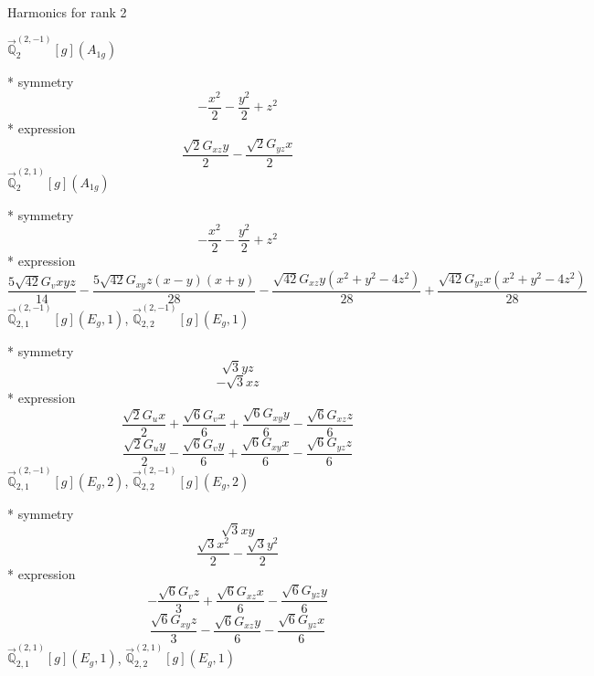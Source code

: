 \documentclass[fleqn,8pt]{jsarticle}
\begin{document}
\noindent * Harmonics for rank 2

\noindent\quad $\vec{\mathbb{Q}}_{2}^{(2,-1)}[g](A_{1g})$

\noindent\quad ** symmetry
\begin{dmath*}
- \frac{x^{2}}{2} - \frac{y^{2}}{2} + z^{2}
\end{dmath*}
\noindent\quad ** expression
\begin{dmath*}
\frac{\sqrt{2} G_{xz} y}{2} - \frac{\sqrt{2} G_{yz} x}{2}
\end{dmath*}
\noindent\quad $\vec{\mathbb{Q}}_{2}^{(2,1)}[g](A_{1g})$

\noindent\quad ** symmetry
\begin{dmath*}
- \frac{x^{2}}{2} - \frac{y^{2}}{2} + z^{2}
\end{dmath*}
\noindent\quad ** expression
\begin{dmath*}
\frac{5 \sqrt{42} G_{v} x y z}{14} - \frac{5 \sqrt{42} G_{xy} z \left(x - y\right) \left(x + y\right)}{28} - \frac{\sqrt{42} G_{xz} y \left(x^{2} + y^{2} - 4 z^{2}\right)}{28} + \frac{\sqrt{42} G_{yz} x \left(x^{2} + y^{2} - 4 z^{2}\right)}{28}
\end{dmath*}
\noindent\quad $\vec{\mathbb{Q}}_{2,1}^{(2,-1)}[g](E_{g},1)$, $\vec{\mathbb{Q}}_{2,2}^{(2,-1)}[g](E_{g},1)$

\noindent\quad ** symmetry
\begin{dmath*}
\sqrt{3} y z
\end{dmath*}
\begin{dmath*}
- \sqrt{3} x z
\end{dmath*}
\noindent\quad ** expression
\begin{dmath*}
\frac{\sqrt{2} G_{u} x}{2} + \frac{\sqrt{6} G_{v} x}{6} + \frac{\sqrt{6} G_{xy} y}{6} - \frac{\sqrt{6} G_{xz} z}{6}
\end{dmath*}
\begin{dmath*}
\frac{\sqrt{2} G_{u} y}{2} - \frac{\sqrt{6} G_{v} y}{6} + \frac{\sqrt{6} G_{xy} x}{6} - \frac{\sqrt{6} G_{yz} z}{6}
\end{dmath*}
\noindent\quad $\vec{\mathbb{Q}}_{2,1}^{(2,-1)}[g](E_{g},2)$, $\vec{\mathbb{Q}}_{2,2}^{(2,-1)}[g](E_{g},2)$

\noindent\quad ** symmetry
\begin{dmath*}
\sqrt{3} x y
\end{dmath*}
\begin{dmath*}
\frac{\sqrt{3} x^{2}}{2} - \frac{\sqrt{3} y^{2}}{2}
\end{dmath*}
\noindent\quad ** expression
\begin{dmath*}
- \frac{\sqrt{6} G_{v} z}{3} + \frac{\sqrt{6} G_{xz} x}{6} - \frac{\sqrt{6} G_{yz} y}{6}
\end{dmath*}
\begin{dmath*}
\frac{\sqrt{6} G_{xy} z}{3} - \frac{\sqrt{6} G_{xz} y}{6} - \frac{\sqrt{6} G_{yz} x}{6}
\end{dmath*}
\noindent\quad $\vec{\mathbb{Q}}_{2,1}^{(2,1)}[g](E_{g},1)$, $\vec{\mathbb{Q}}_{2,2}^{(2,1)}[g](E_{g},1)$
\end{document}
